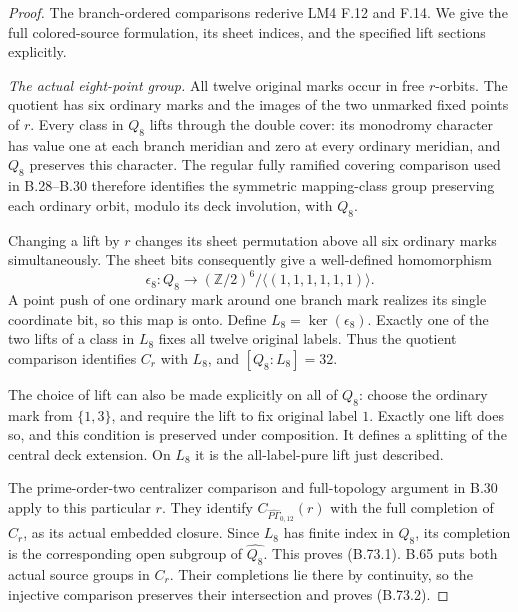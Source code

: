 \begin{proof}
The branch-ordered comparisons rederive LM4 F.12 and F.14.
We give the full colored-source formulation, its sheet indices,
and the specified lift sections explicitly.

\emph{The actual eight-point group.}
All twelve original marks occur in free \(r\)-orbits.
The quotient has six ordinary marks and the images of the
two unmarked fixed points of \(r\).
Every class in \(Q_8\) lifts through the double cover:
its monodromy character has value one at each branch
meridian and zero at every ordinary meridian, and \(Q_8\)
preserves this character.
The regular fully ramified covering comparison used in
B.28--B.30 therefore identifies the symmetric mapping-class
group preserving each ordinary orbit, modulo its deck
involution, with \(Q_8\).

Changing a lift by \(r\) changes its sheet permutation
above all six ordinary marks simultaneously.
The sheet bits consequently give a well-defined
homomorphism
\[
 \epsilon_8:Q_8\longrightarrow
       (\mathbb Z/2)^6/\langle(1,1,1,1,1,1)\rangle.              \tag{B.73.3}
\]
A point push of one ordinary mark around one branch mark
realizes its single coordinate bit, so this map is onto.
Define \(L_8=\ker(\epsilon_8)\).
Exactly one of the two lifts of a class in \(L_8\) fixes
all twelve original labels.  Thus the quotient comparison
identifies \(C_r\) with \(L_8\), and
\([Q_8:L_8]=32\).

The choice of lift can also be made explicitly on all of
\(Q_8\): choose the ordinary mark from \(\{1,3\}\), and
require the lift to fix original label \(1\).
Exactly one lift does so, and this condition is preserved
under composition.  It defines a splitting of the central
deck extension.  On \(L_8\) it is the all-label-pure lift
just described.

The prime-order-two centralizer comparison and full-topology
argument in B.30 apply to this particular \(r\).
They identify \(C_{\widehat{P\Gamma}_{0,12}}(r)\) with
the full completion of \(C_r\), as its actual embedded
closure.  Since \(L_8\) has finite index in \(Q_8\), its
completion is the corresponding open subgroup of
\(\widehat{Q_8}\).  This proves (B.73.1).
B.65 puts both actual source groups in \(C_r\).
Their completions lie there by continuity, so the injective
comparison preserves their intersection and proves
(B.73.2).


\end{proof}
